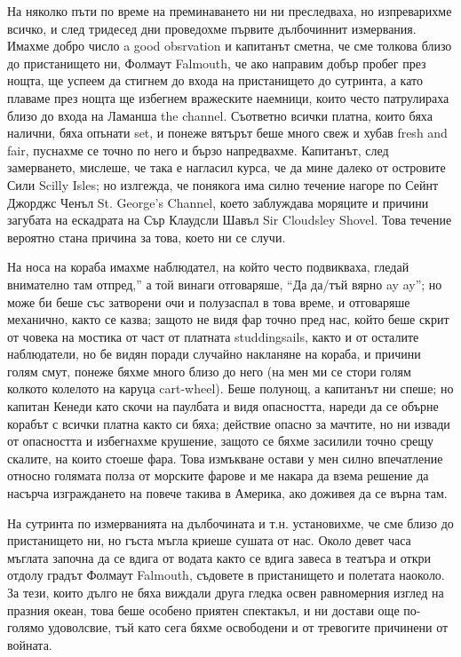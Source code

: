 \documentclass[12pt]{book}
\begin{document}
На няколко пъти по време на преминаването ни ни преследваха, но изпреварихме всичко, и след тридесед дни проведохме първите дълбочиннит измервания. Имахме добро число a good obsrvation и капитанът сметна, че сме толкова близо до пристанището ни, Фолмаут Falmouth, че ако направим добър пробег през нощта, ще успеем да стигнем до входа на пристанището до сутринта, а като плаваме през нощта ще избегнем вражеските наемници, които често патрулираха близо до входа на Ламанша the channel. Съответно всички платна, които бяха налични, бяха опънати set, и понеже вятърът беше много свеж и хубав fresh and fair, пуснахме се точно по него и бързо напредвахме. Капитанът, след замерването, мислеше, че така е нагласил курса, че да мине далеко от островите Сили Scilly Isles; но излгежда, че понякога има силно течение нагоре по Сейнт Джорджс Ченъл St. George's Channel, което заблуждава моряците и причини загубата на ескадрата на Сър Клаудсли Шавъл Sir Cloudsley Shovel. Това течение вероятно стана причина за това, което ни се случи. 

На носа на кораба имахме наблюдател, на който често подвикваха, гледай внимателно там отпред,” а той винаги отговаряше, “Да да/тъй вярно ay ay”; но може би беше със затворени очи и полузаспал в това време, и отговаряше механично, както се казва; защото не видя фар точно пред нас, който беше скрит от човека на мостика от част от платната studdingsails, както и от осталите наблюдатели, но бе видян поради случайно накланяне на кораба, и причини голям смут, понеже бяхме много близо до него (на мен ми се стори голям колкото колелото на каруца cart-wheel). Беше полунощ, а капитанът ни спеше; но капитан Кенеди като скочи на паулбата и видя опасността, нареди да се обърне корабът с всички платна както си бяха; действие опасно за мачтите, но ни извади от опасността и избегнахме крушение, защото се бяхме засилили точно срещу скалите, на които стоеше фара. Това измъкване остави у мен силно впечатление относно голямата полза от морските фарове и ме накара да взема решение да насърча изграждането на повече такива в Америка, ако доживея да се върна там. 

На сутринта по измерванията на дълбочината и т.н. установихме, че сме близо до пристанището ни, но гъста мъгла криеше сушата от нас. Около девет часа мъглата започна да се вдига от водата както се вдига завеса в театъра и откри отдолу градът Фолмаут Falmouth, съдовете в пристанището и полетата наоколо. За тези, които дълго не бяха виждали друга гледка освен равномерния изглед на празния океан, това беше особено приятен спектакъл, и ни достави още по-голямо удоволсвие, тъй като сега бяхме освободени и от тревогите причинени от войната.
\end{document}
